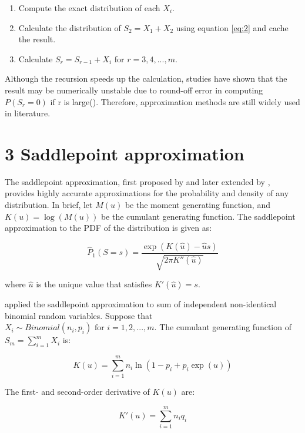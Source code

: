 \begin{enumerate}
	\item Compute the exact distribution of each $X_i$.
	\item Calculate the distribution of $S_2=X_1+X_2$ using equation \ref{eq:2} and cache the result. 
	\item Calculate $S_r = S_{r-1} + X_i$ for $r = 3,4,...,m$.
\end{enumerate}

Although the recursion speeds up the calculation, studies have shown that the result may be numerically unstable due to round-off error in computing $P(S_r=0)$ if r is large(\cite{Yili:al1vGrvv,Eisinga:2013da}). Therefore, approximation methods are still widely used in literature.  

\section{3 Saddlepoint approximation}

The saddlepoint approximation, first proposed by \cite{Daniels:1954hy} and later extended by \cite{Lugannani:1980jm}, provides highly accurate approximations for the probability and density of any distribution. In brief, let $M(u)$ be the moment generating function, and $K(u) = \log(M(u))$ be the cumulant generating function. The saddlepoint approximation to the PDF of the distribution is given as: 

\begin{equation}
\hat{P}_1(S=s)=\frac{\exp(K(\hat{u}) - \hat{u} s)}{\sqrt{2 \pi K''(\hat{u})}}
\end{equation}

where $\hat{u}$ is the unique value that satisfies $K'(\hat{u})=s$. 


 \citet{Eisinga:2013da} applied the saddlepoint approximation to sum of independent non-identical binomial random variables. Suppose that $X_i \sim Binomial(n_i, p_i) \text{ for } i = 1,2,...,m$. The cumulant generating function of $S_m = \sum_{i=1}^m X_i$ is:

\begin{equation}
K(u) = \sum_{i=1}^m n_i \ln (1-p_i + p_i \exp(u))
\end{equation}

The first- and second-order derivative of $K(u)$ are:

\begin{equation}
K'(u) = \sum_{i=1}^m n_i q_i
\end{equation}

